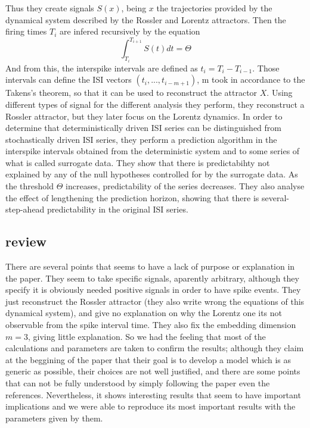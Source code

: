 \documentclass[10pt]{article}
\begin{document}
Thus they create signals $S(x)$, being $x$ the trajectories provided by the dynamical system described by the Rossler and Lorentz attractors. Then the firing times $T_i$ are infered recursively by the equation
\begin{equation}
\int_{T_i}^{T_{i+1}} S(t)dt=\Theta
\end{equation}
And from this, the interspike intervals are defined as $t_i = T_i - T_{i-1}$. Those intervals can define the ISI vectors $(t_i,...,t_{i-m+1})$, m took in accordance to the Takens's theorem, so that it can be used to reconstruct the attractor $X$. Using different types of signal for the different analysis they perform, they reconstruct a Rossler attractor, but they later focus on the Lorentz dynamics. In order to determine that deterministically driven ISI series can be distinguished from stochastically driven ISI series, they perform a prediction algorithm in the interspike intervals obtained from the deterministic system and to some series of what is called surrogate data. They show that there is predictabihty not explained by any of the null hypotheses controlled for by the surrogate data. As the threshold $\Theta$ increases, predictability of the series decreases. They also analyse the effect of lengthening the prediction horizon, showing that there is several-step-ahead predictability in the original ISI series.

\subsection{review}
There are several points that seems to have a lack of purpose or explanation in the paper. They seem to take specific signals, aparently arbitrary, although they specify it is obviously needed positive signals in order to have spike events. They just reconstruct the Rossler attractor (they also write wrong the equations of this dynamical system), and give no explanation on why the Lorentz one its not observable from the spike interval time. They also fix the embedding dimension $m=3$, giving little explanation. So we had the feeling that most of the calculations and parameters are taken to confirm the results; although they claim at the beggining of the paper that their goal is to develop a model which is as generic as possible, their choices are not well justified, and there are some points that can not be fully understood by simply following the paper even the references. Nevertheless, it shows interesting results that seem to have important implications and we were able to reproduce its most important results with the parameters given by them.
\end{document}
